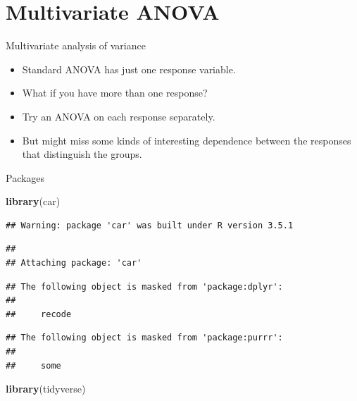 \documentclass[ignorenonframetext,]{beamer}
\newenvironment{Shaded}{\begin{snugshade}}{\end{snugshade}}
\newcommand{\KeywordTok}[1]{\textcolor[rgb]{0.13,0.29,0.53}{\textbf{#1}}}
\newcommand{\NormalTok}[1]{#1}
\begin{document}
\hypertarget{multivariate-anova}{%
\section{Multivariate ANOVA}\label{multivariate-anova}}

\begin{frame}{Multivariate analysis of variance}
\protect\hypertarget{multivariate-analysis-of-variance}{}

\begin{itemize}
\item
  Standard ANOVA has just one response variable.
\item
  What if you have more than one response?
\item
  Try an ANOVA on each response separately.
\item
  But might miss some kinds of interesting dependence between the
  responses that distinguish the groups.
\end{itemize}

\end{frame}

\begin{frame}[fragile]{Packages}
\protect\hypertarget{packages-4}{}

\begin{Shaded}
\begin{Highlighting}[]
\KeywordTok{library}\NormalTok{(car)}
\end{Highlighting}
\end{Shaded}

\begin{verbatim}
## Warning: package 'car' was built under R version 3.5.1
\end{verbatim}

\begin{verbatim}
## 
## Attaching package: 'car'
\end{verbatim}

\begin{verbatim}
## The following object is masked from 'package:dplyr':
## 
##     recode
\end{verbatim}

\begin{verbatim}
## The following object is masked from 'package:purrr':
## 
##     some
\end{verbatim}

\begin{Shaded}
\begin{Highlighting}[]
\KeywordTok{library}\NormalTok{(tidyverse)}
\end{Highlighting}
\end{Shaded}

\end{frame}
\end{document}
